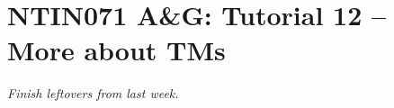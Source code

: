\documentclass[a4paper,12pt]{amsart}
\begin{document}

\section*{NTIN071 A\&G: Tutorial 12 -- More about TMs}


\medskip


\noindent\emph{Finish leftovers from last week.}

\medskip
\end{document}

